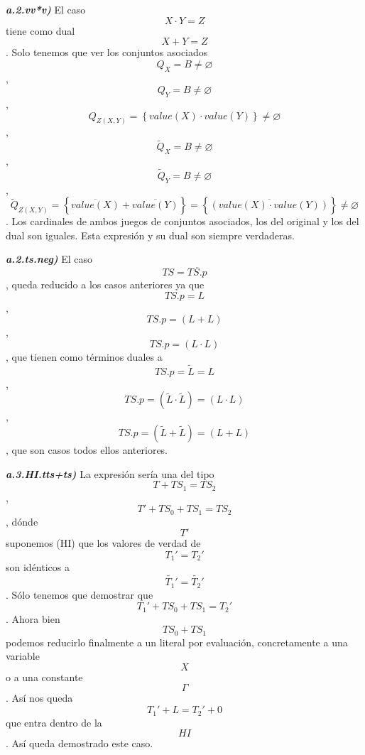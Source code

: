 \documentclass[
]{article}
\begin{document}
\begin{enumerate}
\begin{enumerate}
\begin{enumerate}
\begin{enumerate}
\begin{enumerate}
          \emph{\textbf{a.2.vv*v)}} El caso \[{X \cdot Y} = Z\] tiene
          como dual \[{X + Y} = Z\]. Solo tenemos que ver los conjuntos
          asociados \[{Q_{X} = B} \neq \varnothing\] ,
          \[{Q_{Y} = B} \neq \varnothing\] ,
          \[{Q_{Z{({X,Y})}} = \left\{ {{\mathit{value}{(X)}} \cdot {\mathit{value}{(Y)}}} \right\}} \neq \varnothing\]
          , \[{{\widetilde{Q}}_{X} = B} \neq \varnothing\] ,
          \[{{\widetilde{Q}}_{Y} = B} \neq \varnothing\] ,
          \[{{{\widetilde{Q}}_{Z{({X,Y})}} = \left\{ {\overline{\mathit{value}{(X)}} + \overline{\mathit{value}{(Y)}}} \right\}} = \left\{ \overline{\left( {{\mathit{value}{(X)}}\cdot{\mathit{value}{(Y)}}} \right)} \right\}} \neq \varnothing\]
          . Los cardi\-nales de ambos juegos de conjuntos asociados, los
          del original y los del dual son iguales. Esta expresión y su
          dual son siempre verdaderas.

          \emph{\textbf{a.2.ts.neg)}} El caso
          \[\mathit{TS} = \overline{\mathit{TS.p}}\], queda reducido a
          los casos anteriores ya que \[\mathit{TS.p} = L\] ,
          \[\mathit{TS.p} = \left( {L + L} \right)\] ,
          \[\mathit{TS.p} = \left( {L \cdot L} \right)\], que tienen
          como térmi\-nos duales a
          \[{\mathit{TS.p} = \widetilde{L}} = L\] ,
          \[{\mathit{TS.p} = \left( {\widetilde{L} \cdot \widetilde{L}} \right)} = \left( {L \cdot L} \right)\]
          ,
          \[{\mathit{TS.p} = \left( {\widetilde{L} + \widetilde{L}} \right)} = \left( {L + L} \right)\]
          , que son casos todos ellos anteriores.

          \emph{\textbf{a.3.HI.tts+ts)}} La expresión sería una del tipo
          \[{T + \mathit{TS}_{1}} = \mathit{TS}_{2}\] ,
          \[T{{{' + \mathit{TS}_{0}} + \mathit{TS}_{1}} = \mathit{TS}_{2}}\],
          dónde \[T'\]suponemos (HI) que los valores de ver\-dad de
          \[T_{1}{' = T_{2}}'\] son idénticos a
          \[\widetilde{T_{1}}{' = \widetilde{T_{2}}}'\]. Sólo tenemos
          que de\-mostrar que
          \[T_{1}{{{' + \mathit{TS}_{0}} + \mathit{TS}_{1}} = T_{2}}'\].
          Ahora bien \[\mathit{TS}_{0} + \mathit{TS}_{1}\] podemos
          re\-ducirlo finalmente a un literal por evaluación,
          concretamente a una variable \[X\] o a una constante
          \[\Gamma\]. Así nos queda \[T_{1}{{' + L} = T_{2}}{' + 0}\]que
          entra dentro de la \[\mathit{HI}\]. Así queda demostrado este
          caso.


\end{enumerate}
\end{enumerate}
\end{enumerate}
\end{enumerate}
\end{enumerate}
\end{document}
